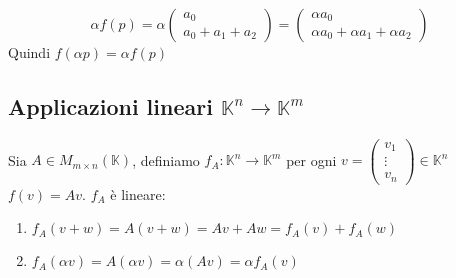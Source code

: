 \documentclass[a4paper]{article}
\theoremstyle{break}
\theoremstyle{break}
\theoremstyle{break}
\theoremstyle{break}
\begin{document}
\begin{example}
\begin{enumerate}
      \vspace{1em}
      \[
      \alpha f(p) = \alpha \begin{pmatrix} 
        a_0 \\
        a_0 + a_1 + a_2
      \end{pmatrix} 
      =
      \begin{pmatrix} 
        \alpha a_0\\
        \alpha a_0 + \alpha a_1 + \alpha a_2
      \end{pmatrix} 
      \] 
      Quindi \( f(\alpha p) = \alpha f(p) \) 
  \end{enumerate}
\end{example}

\subsection{Applicazioni lineari \texorpdfstring{\( \mathbb{K}^n \to \mathbb{K}^m \)}{K\^n -> K\^m}}
Sia \( A \in  M_{m \times n}(\mathbb{K}) \), definiamo \( f_A: \mathbb{K}^n \to \mathbb{K}^m \) 
per ogni \( v = \begin{pmatrix} 
  v_1\\
  \vdots\\
  v_n
\end{pmatrix} \in \mathbb{K}^n\) \( f(v) = Av \). \( f_A \) è lineare:
\begin{enumerate}
  \item \( f_A(v+w) = A(v+w) = Av + Aw = f_A(v) + f_A(w) \) 

  \item \( f_A(\alpha v) = A(\alpha v) = \alpha(Av) = \alpha f_A(v) \) 
\end{enumerate}
\end{document}
